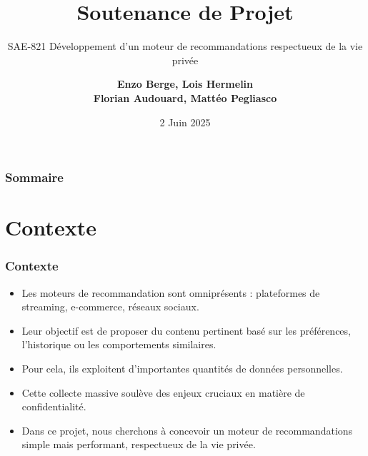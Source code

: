\documentclass{beamer}
\title[Soutenance de Projet]{Soutenance de Projet}
\subtitle{SAE-821 Développement d’un
moteur de recommandations
respectueux de la vie privée}
\author{
    \textbf{Enzo Berge, Lois Hermelin}\\
    \textbf{Florian Audouard, Mattéo Pegliasco}
}
\institute{Université de Toulon, La Garde}
\date{2 Juin 2025}
\begin{document}
\begin{frame}
    \titlepage
\end{frame}

\begin{frame}
    \frametitle{Sommaire}
    \tableofcontents
\end{frame}

\section{Contexte}
\begin{frame}
    \frametitle{Contexte}
    \begin{itemize}
        \item Les moteurs de recommandation sont omniprésents : plateformes de streaming, e-commerce, réseaux sociaux.
        \item Leur objectif est de proposer du contenu pertinent basé sur les préférences, l’historique ou les comportements similaires.
        \item Pour cela, ils exploitent d’importantes quantités de données personnelles.
        \item Cette collecte massive soulève des enjeux cruciaux en matière de confidentialité.
        \item Dans ce projet, nous cherchons à concevoir un moteur de recommandations simple mais performant, respectueux de la vie privée.
    \end{itemize}
\end{frame}


\end{document}
